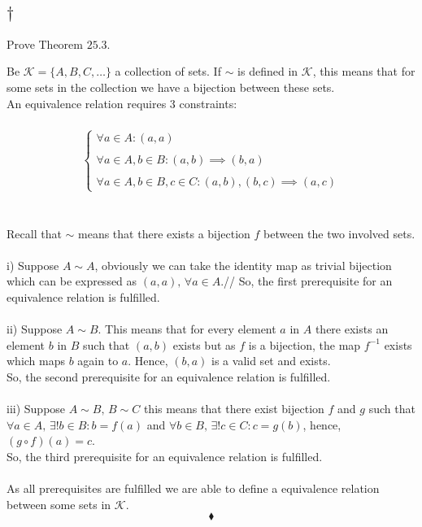 \subsection{$\dagger$}
\begin{tcolorbox}
Prove Theorem $\mathbf{25.3}$. 
\end{tcolorbox}
$$ $$
 Be $\mathscr{K}=\{A,B,C,\dots\}$ a collection of sets. If $\sim$ is defined in $\mathscr{K}$, this means that for some sets in the collection we have a bijection between these sets.\\
 An equivalence relation requires $3$ constraints:\\\\
 \begin{align*}
 \left\{\begin{array}{l}
 \forall a\in A: (a,a)\\\\
 \forall a\in A,b\in B:(a,b)\implies (b,a)\\\\
 \forall a\in A,b\in B,c\in C:(a,b),(b,c)\implies (a,c)
 \end{array}\right.
 \end{align*}\\\\
 Recall that $\sim$ means that there exists a bijection $f$ between the two involved sets.\\\\
 i) Suppose $A\sim A$, obviously we can take the identity map as trivial bijection which can be expressed as $(a,a),\,\forall a\in A $.// So, the first prerequisite for an equivalence relation is fulfilled.\\\\
 ii) Suppose $A\sim B$. This means that for every element $a$ in $A$ there exists an element $b$ in  $B$  such that $(a,b)$ exists but as $f$ is a bijection, the map $f^{-1}$ exists which maps $b$ again to $a$. Hence, $(b,a)$ is a valid set and exists.\\ So, the second prerequisite for an equivalence relation is fulfilled.\\\\
 iii) Suppose $A\sim B,\, B\sim C$ this means that there exist bijection $f$ and $g$ such that $\forall a\in A,\, \exists ! b\in B: b=f(a)$ and $\forall b\in B,\, \exists ! c\in C: c=g(b)$, hence, $(g\circ f )(a)=c$. \\ So, the third prerequisite for an equivalence relation is fulfilled.\\\\
 As all prerequisites are fulfilled we are able to define a equivalence relation between some sets in $\mathscr{K}$.
$$\blacklozenge$$

